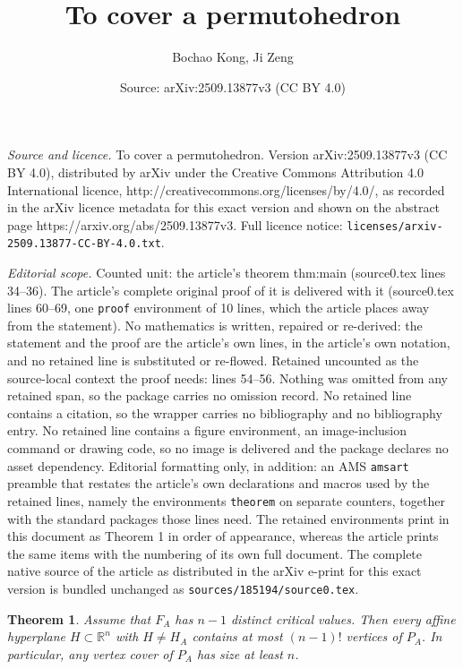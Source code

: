 \documentclass[10pt,a4paper]{amsart}
\title{To cover a permutohedron}
\author{Bochao Kong, Ji Zeng}
\date{Source: arXiv:2509.13877v3 (CC BY 4.0)}
\newtheorem{theorem}{Theorem}
\begin{document}
\maketitle

\noindent\emph{Source and licence.} To cover a permutohedron. Version arXiv:2509.13877v3 (CC BY 4.0), distributed by arXiv under the Creative Commons Attribution 4.0 International licence, http://creativecommons.org/licenses/by/4.0/, as recorded in the arXiv licence metadata for this exact version and shown on the abstract page https://arxiv.org/abs/2509.13877v3. Full licence notice: \texttt{licenses/arxiv-2509.13877-CC-BY-4.0.txt}.\par\smallskip

\noindent\textit{Editorial scope.} Counted unit: the article's theorem thm:main (source0.tex lines 34--36). The article's complete original proof of it is delivered with it (source0.tex lines 60--69, one \texttt{proof} environment of 10 lines, which the article places away from the statement). No mathematics is written, repaired or re-derived: the statement and the proof are the article's own lines, in the article's own notation, and no retained line is substituted or re-flowed.  Retained uncounted as the source-local context the proof needs: lines 54--56.  Nothing was omitted from any retained span, so the package carries no omission record.  No retained line contains a citation, so the wrapper carries no bibliography and no bibliography entry.  No retained line contains a figure environment, an image-inclusion command or drawing code, so no image is delivered and the package declares no asset dependency.  Editorial formatting only, in addition: an AMS \texttt{amsart} preamble that restates the article's own declarations and macros used by the retained lines, namely the environments \texttt{theorem} on separate counters, together with the standard packages those lines need.  The retained environments print in this document as Theorem 1 in order of appearance, whereas the article prints the same items with the numbering of its own full document.  The complete native source of the article as distributed in the arXiv e-print for this exact version is bundled unchanged as \texttt{sources/185194/source0.tex}.
\begin{theorem}\label{general}
  Assume that $F_A$ has $n-1$ distinct critical values. Then every affine hyperplane $H\subset \mathbb{R}^n$ with $H\neq H_A$ contains at most $(n-1)!$ vertices of $P_A$. In particular, any vertex cover of $P_A$ has size at least $n$.
\end{theorem}
\end{document}
